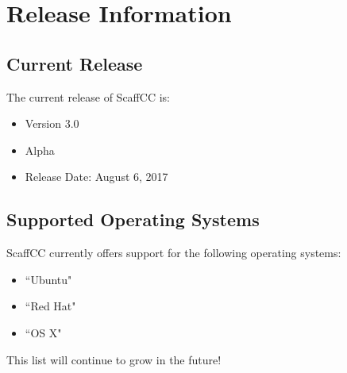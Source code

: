 \chapter{Release Information}\label{ch:release}
\section{Current Release}
    The current release of ScaffCC is:
    \begin{itemize}
        \item Version 3.0
        \item Alpha
        \item Release Date: August 6, 2017
    \end{itemize}
\section{Supported Operating Systems}
    ScaffCC currently offers support for the following operating systems:
    \begin{itemize}
        \item ``Ubuntu"
        \item ``Red Hat"
        \item ``OS X"
    \end{itemize}
    This list will continue to grow in the future!

